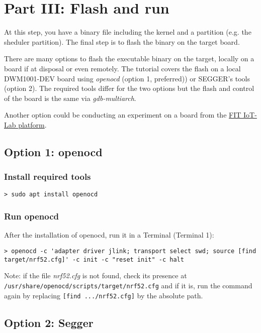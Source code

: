 \documentclass[10pt,a4paper,titlepage]{refart}
\begin{document}
\section{Part III: Flash and run} \label{third}
At this step, you have a binary file including the kernel and a partition (e.g. the sheduler partition).
The final step is to flash the binary on the target board.

There are many options to flash the executable binary on the target, locally on a board if at disposal or even remotely.
The tutorial covers the flash on a local DWM1001-DEV board using \textit{openocd} (option 1, preferred)) or SEGGER's tools (option 2).
The required tools differ for the two options but the flash and control of the board is the same via \textit{gdb-multiarch}.

Another option could be conducting an experiment on a board from the \href{https://www.iot-lab.info/}{FIT IoT-Lab platform}.

\subsection{Option 1: openocd}

\subsubsection{Install required tools}
\begin{lstlisting}[style=BashStyle]
> sudo apt install openocd
\end{lstlisting}

\subsubsection{Run openocd}
After the installation of openocd, run it in a Terminal (Terminal 1):

\begin{lstlisting}[style=BashStyle]
> openocd -c 'adapter driver jlink; transport select swd; source [find target/nrf52.cfg]' -c init -c "reset init" -c halt
\end{lstlisting}
Note: if the file \textit{nrf52.cfg} is not found, check its presence at \texttt{/usr/share/openocd/scripts/target/nrf52.cfg} and if it is, run the command again by replacing \texttt{[find .../nrf52.cfg]} by the absolute path.


\subsection{Option 2: Segger}
\end{document}
